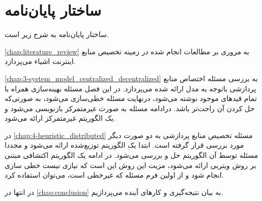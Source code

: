   \section{ساختار پایان‌نامه}
    ساختار پایان‌نامه به شرح زیر است.

    \cref{chap:literature_review} به مروری بر مطالعات انجام شده در زمینه تخصیص منابع اینترنت اشیاء می‌پردازد.
    
    \cref{chap:3-system_model_centralized_decentralized} به بررسی مسئله اختصاص منابع پردازشی باتوجه به مدل ارائه شده می‌پردازد.
    در این فصل مسئله بهینه‌سازی همراه با تمام قیدهای موجود نوشته می‌شود، درنهایت مسئله خطی‌سازی می‌شود، به صورتی‌که حل کردن آن راحت‌تر باشد. 
    درادامه مسئله به صورت غیرمتمرکز بازنویسی می‌شود و یک الگوریتم غیرمتمرکز ارائه می‌شود. 

    در \cref{chap:4-heuristic_distributed} مسئله تخصیص منابع پردازشی به دو صورت دیگر مورد بررسی قرار گرفته است.
    ابتدا یک الگوریتم توزیع‌شده ارائه می‌شود و مجددا مسئله توسط آن الگوریتم حل و بررسی می‌شود. 
    در ادامه یک الگوریتم اکتشافی مبتنی بر روش ویتربی ارائه می‌شود، مزیت این روش این است که نیازی نیست خطی سازی انجام شود و از اولین فرم مسئله که غیرخطی است، می‌توان استفاده کرد. 

    در انتها در \cref{chap:conclusion} به بیان نتیجه‌گیری و کار‌های آینده می‌پردازیم.